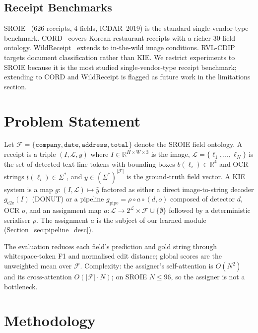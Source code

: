 \documentclass[conference]{IEEEtran}
\begin{document}
\subsection{Receipt Benchmarks}
SROIE~\cite{huang2019icdar} (626 receipts, 4 fields, ICDAR~2019) is
the standard single-vendor-type benchmark.  CORD~\cite{park2019cord}
covers Korean restaurant receipts with a richer 30-field ontology.
WildReceipt~\cite{sun2021wildreceipt} extends to in-the-wild image
conditions.  RVL-CDIP targets document classification rather than KIE.
We restrict experiments to SROIE because it is the most studied
single-vendor-type receipt benchmark; extending to CORD and
WildReceipt is flagged as future work in the limitations section.


\section{Problem Statement}
\label{sec:formal}

Let $\mathcal{F}=\{\texttt{company},\texttt{date},\texttt{address},
\texttt{total}\}$ denote the SROIE field ontology.  A receipt is a
triple $(I, \mathcal{L}, y)$ where $I \in \mathbb{R}^{H\times W\times 3}$
is the image, $\mathcal{L}=\{\ell_1,\ldots,\ell_N\}$ is the set of
detected text-line tokens with bounding boxes $b(\ell_i)\in\mathbb{R}^4$
and OCR strings $t(\ell_i)\in\Sigma^*$, and
$y\in(\Sigma^*)^{|\mathcal{F}|}$ is the ground-truth field vector.
A KIE system is a map $g:(I,\mathcal{L})\mapsto\hat{y}$ factored as
either a direct image-to-string decoder $g_{\text{e2e}}(I)$ (DONUT)
or a pipeline $g_{\text{pipe}}=\rho\circ a\circ(d,o)$ composed of
detector $d$, OCR $o$, and an assignment map
$a:\mathcal{L}\to2^{\mathcal{L}}\times\mathcal{F}\cup\{\emptyset\}$
followed by a deterministic serialiser $\rho$.  The assignment $a$ is
the subject of our learned module (Section~\ref{sec:pipeline_desc}).

The evaluation reduces each field's prediction and gold string
through whitespace-token F1 and normalised edit distance; global
scores are the unweighted mean over $\mathcal{F}$.  Complexity: the
assigner's self-attention is $O(N^2)$ and its cross-attention
$O(|\mathcal{F}|\cdot N)$; on SROIE $N\le 96$, so the assigner is
not a bottleneck.

\section{Methodology}
\label{sec:method}
\end{document}
